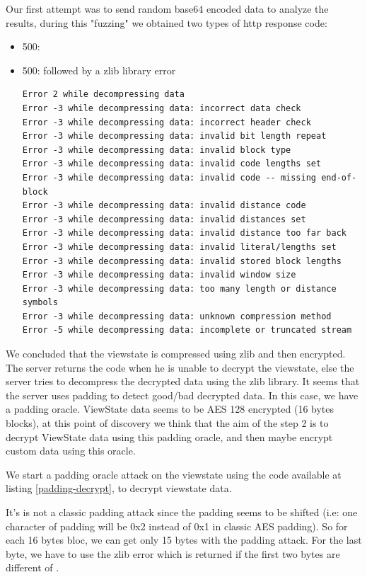 \documentclass[a4paper]{article}
\begin{document}
Our first attempt was to send random base64 encoded data to analyze the results, during this "fuzzing" we obtained two types of http response code:
\begin{itemize}
    \item 500: 
    \item 500:  followed by a zlib library error\begin{lstlisting}[caption={},numbers=none]
Error 2 while decompressing data
Error -3 while decompressing data: incorrect data check
Error -3 while decompressing data: incorrect header check
Error -3 while decompressing data: invalid bit length repeat
Error -3 while decompressing data: invalid block type
Error -3 while decompressing data: invalid code lengths set
Error -3 while decompressing data: invalid code -- missing end-of-block
Error -3 while decompressing data: invalid distance code
Error -3 while decompressing data: invalid distances set
Error -3 while decompressing data: invalid distance too far back
Error -3 while decompressing data: invalid literal/lengths set
Error -3 while decompressing data: invalid stored block lengths
Error -3 while decompressing data: invalid window size
Error -3 while decompressing data: too many length or distance symbols
Error -3 while decompressing data: unknown compression method
Error -5 while decompressing data: incomplete or truncated stream
    \end{lstlisting}
\end{itemize}

We concluded that the viewstate is compressed using zlib and then encrypted. The server returns the code  when he is unable to decrypt the viewstate, else the server tries to decompress the decrypted data using the zlib library.
It seems that the server uses padding to detect good/bad decrypted data. In this case, we have a padding oracle. ViewState data seems to be AES 128 encrypted (16 bytes blocks), at this point of discovery we think that the aim of the step 2 is to decrypt ViewState data using this padding oracle, and then maybe encrypt custom data using this oracle.

We start a padding oracle attack on the viewstate using the code available at listing \ref{padding-decrypt}, to decrypt viewstate data. \newline

It's is not a classic padding attack since the padding seems to be shifted (i.e: one character of padding will be 0x2 instead of 0x1 in classic AES padding). So for each 16 bytes bloc, we can get only 15 bytes with the padding attack. For the last byte, we have to use the zlib error  which is returned if the first two bytes are different of . \newline
\end{document}
